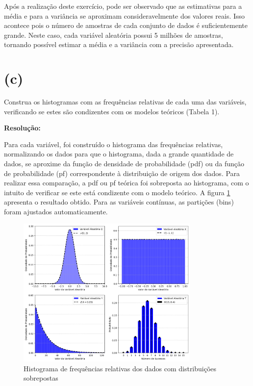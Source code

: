 \documentclass[]{abntex2}
\begin{document}
Após a realização deste exercício, pode ser observado que as estimativas para a média e para a variância se aproximam consideravelmente dos valores reais. Isso acontece pois o número de amostras de cada conjunto de dados é suficientemente grande. Neste caso, cada variável aleatória possui 5 milhões de amostras, tornando possível estimar a média e a variância com a precisão apresentada.

\section*{\textbf{(c)}}

\noindent Construa os histogramas com as frequências relativas de cada uma das variáveis,
verificando se estes são condizentes com os modelos teóricos (Tabela 1).

\textbf{Resolução:}

Para cada variável, foi construído o histograma das frequências relativas, normalizando os dados para que o histograma, dada a grande quantidade de dados, se aproxime da função de densidade de probabilidade (pdf) ou da função de probabilidade (pf) correspondente à distribuição de origem dos dados. Para realizar essa comparação, a pdf ou pf teórica foi sobreposta ao histograma, com o intuito de verificar se este está condizente com o modelo teórico. A figura \ref{fig:hist} apresenta o resultado obtido. Para as variáveis contínuas, as partições (bins) foram ajustados automaticamente.

\begin{figure}[H]
    \centering 
    \includegraphics[width=0.8\textwidth]{imgs/hist.png}
    \caption{Histograma de frequências relativas dos dados com distribuições sobrepostas}
    \label{fig:hist} %
\end{figure}
\end{document}
